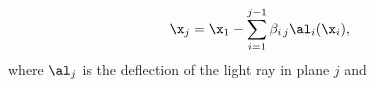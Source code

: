 \begin{equation}
\label{eqn:mp_full}
\x_j=\x_1 - \sum\limits_{i=1}^{j-1} \beta_{i\,j} \al_i(\x_i),  
\end{equation}
where $\al_j$ is the deflection of the light ray in plane $j$ and
  
  